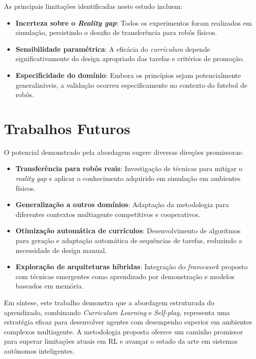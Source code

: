 As principais limitações identificadas neste estudo incluem:

\begin{itemize}
    \item \textbf{Incerteza sobre o \textit{Reality gap}}: Todos os experimentos foram realizados em simulação, persistindo o desafio de transferência para robôs físicos.
    
    \item \textbf{Sensibilidade paramétrica}: A eficácia do \textit{curriculum} depende significativamente do design apropriado das tarefas e critérios de promoção.
    
    \item \textbf{Especificidade do domínio}: Embora os princípios sejam potencialmente generalizáveis, a validação ocorreu especificamente no contexto do futebol de robôs.
\end{itemize}

\section{Trabalhos Futuros}

O potencial demonstrado pela abordagem sugere diversas direções promissoras:

\begin{itemize}
    \item \textbf{Transferência para robôs reais}: Investigação de técnicas para mitigar o \textit{reality gap} e aplicar o conhecimento adquirido em simulação em ambientes físicos.
    
    \item \textbf{Generalização a outros domínios}: Adaptação da metodologia para diferentes contextos multiagente competitivos e cooperativos.
    
    \item \textbf{Otimização automática de currículos}: Desenvolvimento de algoritmos para geração e adaptação automática de sequências de tarefas, reduzindo a necessidade de design manual.
    
    \item \textbf{Exploração de arquiteturas híbridas}: Integração do \textit{framework} proposto com técnicas emergentes como aprendizado por demonstração e modelos baseados em memória.
\end{itemize}

Em síntese, este trabalho demonstra que a abordagem estruturada do aprendizado, combinando \textit{Curriculum Learning} e \textit{Self-play}, representa uma estratégia eficaz para desenvolver agentes com desempenho superior em ambientes complexos multiagente. A metodologia proposta oferece um caminho promissor para superar limitações atuais em RL e avançar o estado da arte em sistemas autônomos inteligentes.
